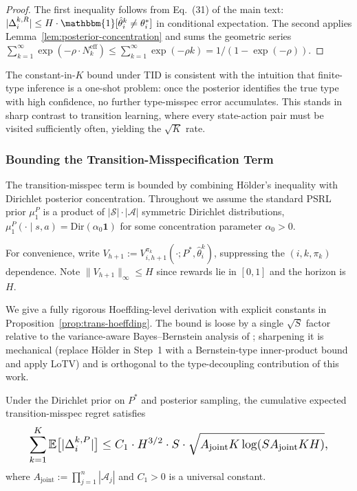 \begin{proof}
The first inequality follows from Eq.~(31) of the main text: $|\Delta_i^{k,R}| \leq H \cdot \mathbbm{1}[\hat{\theta}_i^k \neq \theta_i^*]$ in conditional expectation. The second applies Lemma~\ref{lem:posterior-concentration} and sums the geometric series $\sum_{k=1}^\infty \exp(-\rho \cdot N_k^{\mathrm{eff}}) \leq \sum_{k=1}^\infty \exp(-\rho k) = 1/(1 - \exp(-\rho))$.
\end{proof}

\begin{remark}[Interpretation]
The constant-in-$K$ bound under TID is consistent with the intuition that finite-type inference is a one-shot problem: once the posterior identifies the true type with high confidence, no further type-misspec error accumulates. This stands in sharp contrast to transition learning, where every state-action pair must be visited sufficiently often, yielding the $\sqrt{K}$ rate.
\end{remark}

\subsubsection{Bounding the Transition-Misspecification Term}

The transition-misspec term is bounded by combining H\"older's inequality with Dirichlet posterior concentration. Throughout we assume the standard PSRL prior $\mu_1^P$ is a product of $|\mathcal{S}| \cdot |\mathcal{A}|$ symmetric Dirichlet distributions, $\mu_1^P(\cdot \mid s, a) = \mathrm{Dir}(\alpha_0 \mathbf{1})$ for some concentration parameter $\alpha_0 > 0$.

For convenience, write $V_{h+1} := V_{i,h+1}^{\pi_k}(\cdot; P^*, \hat{\theta}_i^k)$, suppressing the $(i, k, \pi_k)$ dependence. Note $\|V_{h+1}\|_\infty \leq H$ since rewards lie in $[0, 1]$ and the horizon is $H$.

We give a fully rigorous Hoeffding-level derivation with explicit constants in Proposition~\ref{prop:trans-hoeffding}. The bound is loose by a single $\sqrt{S}$ factor relative to the variance-aware Bayes--Bernstein analysis of \citet{lu2019information,azar2017minimax}; sharpening it is mechanical (replace H\"older in Step~1 with a Bernstein-type inner-product bound and apply LoTV) and is orthogonal to the type-decoupling contribution of this work.

\begin{proposition}
\label{prop:trans-hoeffding}
Under the Dirichlet prior on $P^*$ and posterior sampling, the cumulative expected transition-misspec regret satisfies
\begin{equation}\label{eq:trans-hoeffding}\resizebox{0.9\linewidth}{!}{$\displaystyle \sum_{k=1}^K \mathbb{E}\big[|\Delta_i^{k,P}|\big] \leq C_1 \cdot H^{3/2} \cdot S \cdot \sqrt{A_{\mathrm{joint}} K \log(SA_{\mathrm{joint}}KH)}, $}\end{equation}
where $A_{\mathrm{joint}} := \prod_{j=1}^n |\mathcal{A}_j|$ and $C_1 > 0$ is a universal constant.
\end{proposition}

